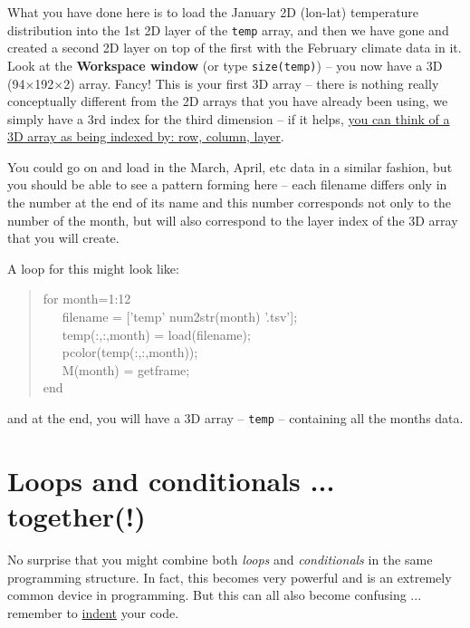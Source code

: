 \documentclass{tufte-book} %
\newenvironment{docspec}{\begin{quotation}\ttfamily\parskip0pt\parindent0pt\ignorespaces}{\end{quotation}}
\begin{document}
What you have done here is to load the January 2D (lon-lat) temperature distribution into the 1st 2D layer of the \texttt{temp} array, and then we have gone and created a second 2D layer on top of the first with the February climate data in it. Look at the \textbf{Workspace window} (or type \texttt{size(temp)}) -- you now have a 3D (94\(\times\)192\(\times\)2) array. Fancy! This is your first 3D array -- there is nothing really conceptually different from the 2D arrays that you have already been using, we simply have a 3rd index for the third dimension -- if it helps, \uline{you can think of a 3D array as being indexed by: row, column, layer}. 

You could go on and load in the March, April, etc data in a similar fashion, but you should be able to see a pattern forming here -- each filename differs only in the number at the end of its name and this number corresponds not only to the number of the month, but will also correspond to the layer index of the 3D array that you will create.

\newpage
A loop for this might look like:
\begin{docspec}
for month=1:12\\
\ \ \ filename = [\textcolor[rgb]{1,0,1}{'temp'} num2str(month) \textcolor[rgb]{1,0,1}{'.tsv'}];\\
\ \ \ temp(:,:,month) = load(filename);\\
\ \ \ pcolor(temp(:,:,month));\\
\ \ \ M(month) = getframe;\\
end
\end{docspec}
and at the end, you will have a 3D array -- \texttt{temp} -- containing all the months data.


\newpage


\section{Loops and conditionals ... together(!)}


No surprise that you might combine both \textit{loops} and \textit{conditionals} in the same programming structure. In fact, this becomes very powerful and is an extremely common device in programming. But this can all also become confusing ... remember to \uline{indent} your code.
\end{document}
